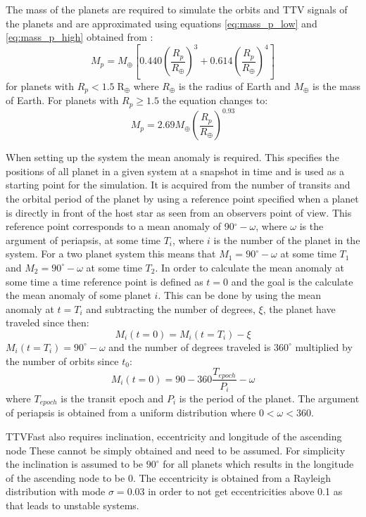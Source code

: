 \documentclass[12pt]{report}
\begin{document}
	The mass of the planets are required to simulate the orbits and TTV signals of the planets and are approximated using equations \ref{eq:mass_p_low} and \ref{eq:mass_p_high} obtained from \cite{2013ApJ...768...14W}:
	\begin{equation}
	\label{eq:mass_p_low}
	M_p = M_{\oplus} \left[0.440 \left(\frac{R_p}{R_{\oplus}}\right)^3 + 0.614\left(\frac{R_p}{R_{\oplus}}\right)^4\right]
	\end{equation}
	for planets with $R_p < 1.5 \; \mathrm{R_{\oplus}}$ where $R_{\oplus}$ is the radius of Earth and $M_{\oplus}$ is the mass of Earth. For planets with $R_p \geq 1.5$ the equation changes to:
	\begin{equation}
	\label{eq:mass_p_high}
	M_p = 2.69 M_{\oplus}\left(\frac{R_p}{R_{\oplus}}\right)^{0.93}
	\end{equation}
	
	When setting up the system the mean anomaly is required. This specifies the positions of all planet in a given system at a snapshot in time and is used as a starting point for the simulation. It is acquired from the number of transits and the orbital period of the planet by using a reference point specified when a planet is directly in front of the host star as seen from an observers point of view. This reference point corresponds to a mean anomaly of 90$^{\circ} - \omega$, where $\omega$ is the argument of periapsis, at some time $T_i$, where $i$ is the number of the planet in the system. For a two planet system this means that $M_1=90^{\circ} - \omega$ at some time $T_1$ and $M_2=90^{\circ} - \omega$ at some time $T_2$. In order to calculate the mean anomaly at some time a time reference point is defined as $t=0$ and the goal is the calculate the mean anomaly of some planet $i$. This can be done by using the mean anomaly at $t = T_i$ and subtracting the number of degrees, $\xi$, the planet have traveled since then:
\begin{equation}
	M_i(t=0) = M_i(t=T_i) - \xi
\end{equation}
	$M_i(t=T_i) = 90^{\circ} - \omega$ and the number of degrees traveled is $360^{\circ}$ multiplied by the number of orbits since $t_0$:
\begin{equation}
	M_i(t=0) = 90 - 360 \frac{T_{epoch}}{P_i} - \omega
\end{equation}
	where $T_{epoch}$ is the transit epoch and $P_i$ is the period of the planet. The argument of periapsis is obtained from a uniform distribution where $0 < \omega < 360$. 
	
	TTVFast also requires inclination, eccentricity and longitude of the ascending node These cannot be simply obtained and need to be assumed. For simplicity the inclination is assumed to be $90^{\circ}$ for all planets which results in the longitude of the ascending node to be 0. The eccentricity is obtained from a Rayleigh distribution  \citep{2018arXiv180700549V, 2013ApJ...772...74W} with mode $\sigma = 0.03$ in order to not get eccentricities above 0.1 as that leads to unstable systems. 
	
\end{document}
